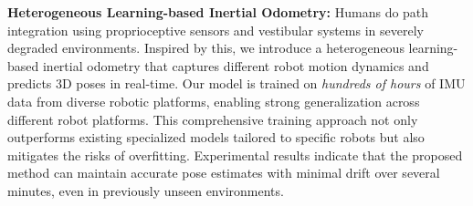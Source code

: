 

\textbf{Heterogeneous Learning-based Inertial Odometry:} 
Humans do path integration using proprioceptive sensors and vestibular systems in severely degraded environments. Inspired by this, we introduce a heterogeneous learning-based inertial odometry that captures different robot motion dynamics and predicts 3D poses in real-time. Our model is trained on \textit{hundreds of hours} of IMU data from diverse robotic platforms, enabling strong generalization across different robot platforms. This comprehensive training approach not only outperforms existing specialized models tailored to specific robots but also mitigates the risks of overfitting. 
Experimental results indicate that the proposed method can maintain accurate pose estimates with minimal drift over several minutes, even in previously unseen environments.


